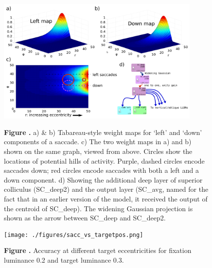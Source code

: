 \documentclass{frontiersSCNS}
\begin{document}
\begin{figure}[t]
\begin{center}
\includegraphics[width=0.9\textwidth]{./figures/scdeep_plus.png}
\end{center}
\textbf{\label{scdeep} Figure .}
{ a) \& b) Tabareau-style weight maps for `left' and `down' components
of a saccade. c) The two weight maps in a) and b) shown on the same
graph, viewed from above. Circles show the locations of potential
hills of activity. Purple, dashed circles encode saccades down;
red circles encode saccades with both a left and a down component. d)
Showing the additional deep layer of superior colliculus (SC\_deep2)
and the output layer (SC\_avg, named for the fact that in an earlier
version of the model, it received the output of the centroid of
SC\_deep).  The widening Gaussian projection is shown as the arrow
between SC\_deep and SC\_deep2.}
\end{figure}

\begin{figure}[t]
\begin{center}
\texttt{[image: ./figures/sacc\_vs\_targetpos.png]}
\end{center}
\textbf{\label{sacc_vs_targ} Figure .}
{ Accuracy at different target eccentricities for fixation luminance
0.2 and target luminance 0.3.}
\end{figure}
\end{document}
